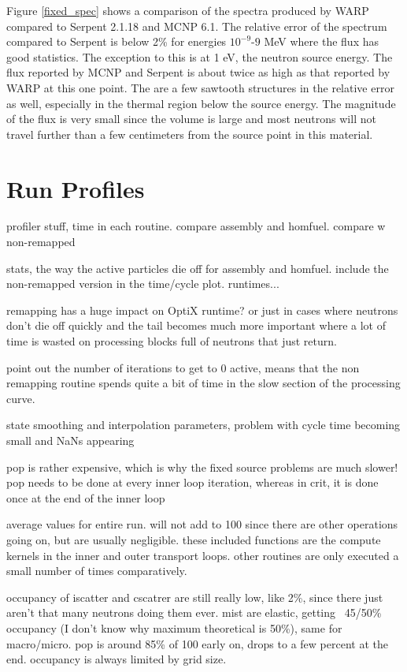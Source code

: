 Figure \ref{fixed_spec} shows a comparison of the spectra produced by WARP compared to Serpent 2.1.18 and MCNP 6.1.  The relative error of the spectrum compared to Serpent is below 2\% for energies $10^{-9}$-$9$ MeV where the flux has good statistics.  The exception to this is at 1 eV, the neutron source energy.  The flux reported by MCNP and Serpent is about twice as high as that reported by WARP at this one point.  The are a few sawtooth structures in the relative error as well, especially in the thermal region below the source energy.  The magnitude of the flux is very small since the volume is large and most neutrons will not travel further than a few centimeters from the source point in this material.

\section{Run Profiles}

profiler stuff, time in each routine.  compare assembly and homfuel.  compare w non-remapped

stats, the way the active particles die off for assembly and homfuel.  include the non-remapped version in the time/cycle plot.  runtimes...

remapping has a huge impact on OptiX runtime?  or just in cases where neutrons don't die off quickly and the tail becomes much more important where a lot of time is wasted on processing blocks full of neutrons that just return.

point out the number of iterations to get to 0 active, means that the non remapping routine spends quite a bit of time in the slow section of the processing curve.

state smoothing and interpolation parameters, problem with cycle time becoming small and NaNs appearing

pop is rather expensive, which is why the fixed source problems are much slower!  pop needs to be done at every inner loop iteration, whereas in crit, it is done once at the end of the inner loop

average values for entire run.  will not add to 100 since there are other operations going on, but are usually negligible.  these included functions are the compute kernels in the inner and outer transport loops.  other routines are only executed a small number of times comparatively.

occupancy of iscatter and cscatrer are still really low, like 2\%, since there just aren't that many neutrons doing them ever.  mist are elastic, getting ~45/50\% occupancy (I don't know why maximum theoretical is 50\%), same for macro/micro.  pop is around 85\% of 100 early on, drops to a few percent at the end.   occupancy is always limited by grid size.

